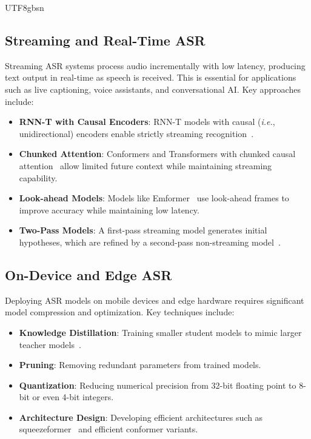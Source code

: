 \documentclass[12pt,a4paper]{article}
\newcommand{\ie}{\textit{i.e.}}
\begin{document}
\begin{CJK}{UTF8}{gbsn}
\subsection{Streaming and Real-Time ASR}
\label{subsec:streaming}

Streaming ASR systems process audio incrementally with low latency, producing text output in real-time as speech is received. This is essential for applications such as live captioning, voice assistants, and conversational AI. Key approaches include:

\begin{itemize}[leftmargin=*]
    \item \textbf{RNN-T with Causal Encoders}: RNN-T models with causal (\ie, unidirectional) encoders enable strictly streaming recognition~\cite{he2019streaming}.
    \item \textbf{Chunked Attention}: Conformers and Transformers with chunked causal attention~\cite{gulati2020conformer} allow limited future context while maintaining streaming capability.
    \item \textbf{Look-ahead Models}: Models like Emformer~\cite{shi2021emformer} use look-ahead frames to improve accuracy while maintaining low latency.
    \item \textbf{Two-Pass Models}: A first-pass streaming model generates initial hypotheses, which are refined by a second-pass non-streaming model~\cite{saon2023advancing}.
\end{itemize}

\subsection{On-Device and Edge ASR}
\label{subsec:edge}

Deploying ASR models on mobile devices and edge hardware requires significant model compression and optimization. Key techniques include:

\begin{itemize}[leftmargin=*]
    \item \textbf{Knowledge Distillation}: Training smaller student models to mimic larger teacher models~\cite{hinton2015distilling}.
    \item \textbf{Pruning}: Removing redundant parameters from trained models.
    \item \textbf{Quantization}: Reducing numerical precision from 32-bit floating point to 8-bit or even 4-bit integers.
    \item \textbf{Architecture Design}: Developing efficient architectures such as squeezeformer~\cite{kim2023squeezeformer} and efficient conformer variants.
\end{itemize}


\end{CJK}
\end{document}
